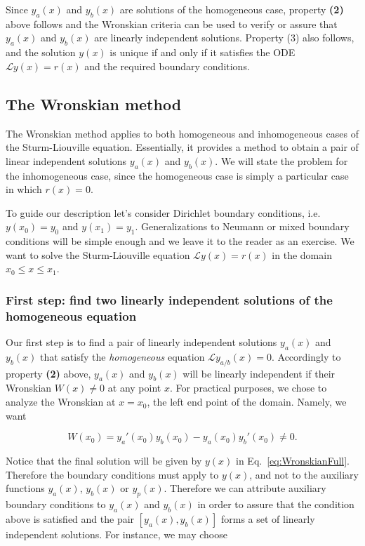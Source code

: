 Since $y_a(x)$ and $y_b(x)$ are solutions of the homogeneous case, property \textbf{(2)} above follows and the Wronskian criteria can be used to verify or assure that $y_a(x)$ and $y_b(x)$ are linearly independent solutions. Property (3) also follows, and the solution $y(x)$ is unique if and only if it satisfies the ODE $\mathcal{L}y(x) = r(x)$ and the required boundary conditions.

\subsection{The Wronskian method}

The Wronskian method applies to both homogeneous and inhomogeneous cases of the Sturm-Liouville equation. Essentially, it provides a method to obtain a pair of linear independent solutions $y_a(x)$ and $y_b(x)$. We will state the problem for the inhomogeneous case, since the homogeneous case is simply a particular case in which $r(x) = 0$.

To guide our description let's consider Dirichlet boundary conditions, i.e. $y(x_0) = y_0$ and $y(x_1) = y_1$. Generalizations to Neumann or mixed boundary conditions will be simple enough and we leave it to the reader as an exercise. We want to solve the Sturm-Liouville equation $\mathcal{L}y(x) = r(x)$ in the domain $x_0 \leq x \leq x_1$.

\subsubsection{First step: find two linearly independent solutions of the homogeneous equation}

Our first step is to find a pair of linearly independent solutions $y_a(x)$ and $y_b(x)$ that satisfy the \textit{homogeneous} equation $\mathcal{L}y_{a/b}(x) = 0$. Accordingly to property \textbf{(2)} above, $y_a(x)$ and $y_b(x)$ will be linearly independent if their Wronskian $W(x) \neq 0$ at any point $x$. For practical purposes, we chose to analyze the Wronskian at $x = x_0$, the left end point of the domain. Namely, we want

\begin{equation}
 W(x_0) = y_a'(x_0)y_b(x_0) - y_a(x_0)y_b'(x_0) \neq 0.
\end{equation}

Notice that the final solution will be given by $y(x)$ in Eq.~\eqref{eq:WronskianFull}. Therefore the boundary conditions must apply to $y(x)$, and not to the auxiliary functions $y_a(x)$, $y_b(x)$ or $y_p(x)$. Therefore we can attribute auxiliary boundary conditions to $y_a(x)$ and $y_b(x)$ in order to assure that the condition above is satisfied and the pair $[y_a(x), y_b(x)]$ forms a set of linearly independent solutions. For instance, we may choose

